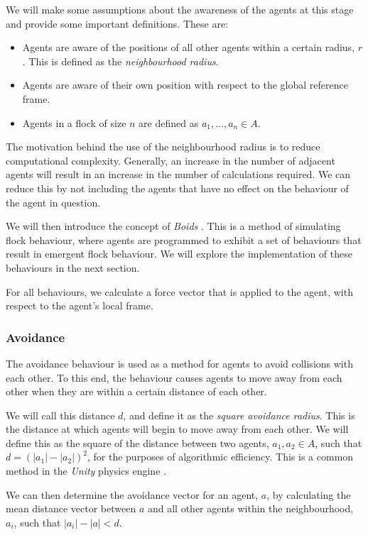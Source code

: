 \documentclass[12pt]{article}
\begin{document}
We will make some assumptions about the awareness of the agents at this stage and provide some important definitions.
These are:
\begin{itemize}
    \item Agents are aware of the positions of all other agents within a certain radius, $r$. This is defined as the \emph{neighbourhood radius}.
    \item Agents are aware of their own position with respect to the global reference frame.
    \item Agents in a flock of size $n$ are defined as $a_1,...,a_n \in A$.
\end{itemize}

The motivation behind the use of the neighbourhood radius is to reduce computational complexity. Generally, an increase in the number of adjacent agents will result in an increase in the number of calculations required. We can reduce this by not including the agents that have no effect on the behaviour of the agent in question.

We will then introduce the concept of \emph{Boids} \cite{Reynolds}. This is a method of simulating flock behaviour, where agents are programmed to exhibit a set of behaviours that result in emergent flock behaviour. We will explore the implementation of these behaviours in the next section.

For all behaviours, we calculate a force vector that is applied to the agent, with respect to the agent's local frame.

\subsubsection{Avoidance}

The avoidance behaviour is used as a method for agents to avoid collisions with each other. To this end, the behaviour causes agents to move away from each other when they are within a certain distance of each other. 

We will call this distance $d$, and define it as the \emph{square avoidance radius}. This is the distance at which agents will begin to move away from each other. We will define this as the square of the distance between two agents, $a_1,a_2 \in A$, such that $d = (|a_1|-|a_2|)^2$, for the purposes of algorithmic efficiency. This is a common method in the \emph{Unity} physics engine \cite{unity}.

We can then determine the avoidance vector for an agent, $a$, by calculating the mean distance vector between $a$ and all other agents within the neighbourhood, $a_i$, such that $|a_i| - |a| < d$.
\end{document}
